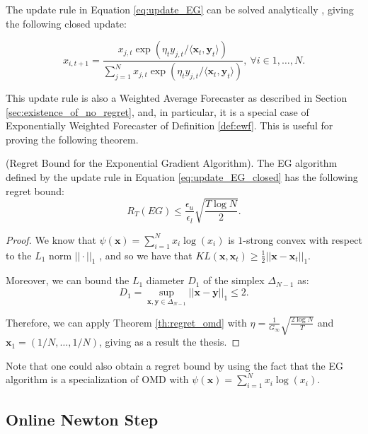 The update rule in Equation \eqref{eq:update_EG} can be solved analytically \cite{helmbold1998line}, giving the following closed update:

\begin{equation}\label{eq:update_EG_closed}
x_{i,t+1}=\frac{x_{j,t}\exp\left(\eta_t{y_{j,t}}/\langle\mathbf x_t,\mathbf y_t\rangle\right)}{\sum\limits_{j=1}^Nx_{j,t}\exp\left(\eta_t{y_{j,t}}/\langle\mathbf x_t,\mathbf y_t\rangle\right)},\ \forall i\in1,\ldots,N.
\end{equation}

This update rule is also a Weighted Average Forecaster as described in Section \ref{sec:existence_of_no_regret}, and, in particular, it is a special case of Exponentially Weighted Forecaster of Definition \ref{def:ewf}. This is useful for proving the following theorem.

\begin{theorem}(Regret Bound for the Exponential Gradient Algorithm).
The EG algorithm defined by the update rule in Equation \eqref{eq:update_EG_closed} has the following regret bound:
\begin{equation}
R_T(EG)\le \frac{\epsilon_u}{\epsilon_l}\sqrt{\frac{T\log N}{2}}.
\end{equation}
\end{theorem}

\begin{proof}
We know that $\psi(\mathbf x)=\sum\limits_{i=1}^Nx_i\log(x_i)$ is $1$-strong convex with respect to the $L_1$ norm $||\cdot||_1$ \cite{shalev2007online}, and so we have that $KL(\mathbf x,\mathbf x_t)\ge\frac{1}{2}||\mathbf x-\mathbf x_t||_1$.

Moreover, we can bound the $L_1$ diameter $D_1$ of the simplex $\Delta_{N-1}$ as: 
$$D_1=\sup\limits_{\mathbf x,\mathbf y\in\Delta_{N-1}}||\mathbf x-\mathbf y||_1\le2.$$

Therefore, we can apply Theorem \ref{th:regret_omd} with $\eta=\frac{1}{G_\infty}\sqrt{\frac{2\log N}{T}}$ and $\mathbf x_1=(1/N,\ldots,1/N)$, giving as a result the thesis.
\end{proof}

Note that one could also obtain a regret bound by using the fact that the EG algorithm is a specialization of OMD with $\psi(\mathbf x)=\sum\limits_{i=1}^N x_i\log(x_i)$. 

\subsection{Online Newton Step}\label{sec:ONS}

